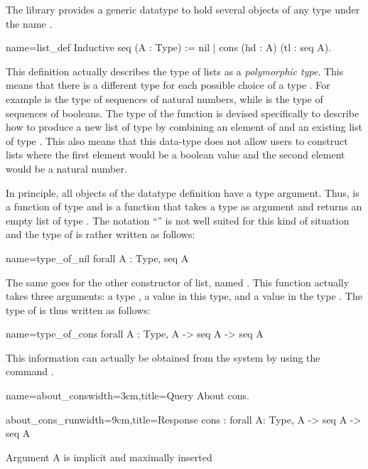 The \mcbMC{} library provides a generic datatype to hold
several objects of any type under the name .

\begin{coq}{name=list_def}{}
Inductive seq (A : Type) := nil | cons (hd : A) (tl : seq A).
\end{coq}
This definition actually describes the type of lists as a {\em
  polymorphic type}.  This means that there is a different type
 for each possible choice of a type .  For example
 is the type of sequences of natural numbers, while
 is the type of sequences of booleans.
The type of the
function  is devised specifically to describe how to produce a
new list of type  by combining an element of  and an
existing list of type .  This also means that this data-type
does not allow users to construct lists where the first element would be
a boolean value and the second element would be a natural number.

In principle, all objects of the datatype definition have a type
argument.  Thus,  is a function of type  and
 is a function that takes a type  as argument and returns
an empty list of type .  The notation ``'' is not
well suited for this kind of situation and the type of  is
rather written as follows:

\begin{coq}{name=type_of_nil}{}
  forall A : Type, seq A
\end{coq}
The same goes for the other constructor of list, named .  This
function actually takes three arguments: a type , a value in this
type, and a value in the type .  The type of  is
thus written as follows:

\begin{coq}{name=type_of_cons}{}
  forall A : Type, A -> seq A -> seq A
\end{coq}
This information can actually be obtained from the system by using the 
command .

\begin{coq}{name=about_cons}{width=3cm,title=Query}
About cons.
$~$
$~$
$~$
\end{coq}
\begin{coqout}{about_cons_run}{width=9cm,title=Response}
cons : forall A: Type, A -> seq A -> seq A

Argument A is implicit and maximally inserted
\end{coqout}

